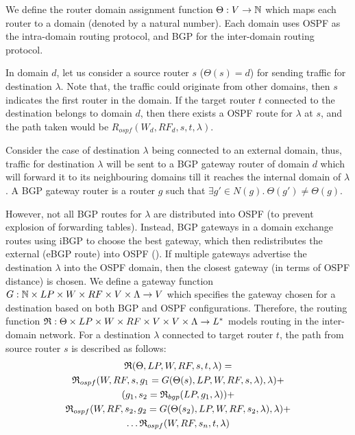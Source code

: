 We define the router domain assignment function
$\Theta: V \rightarrow \mathbb{N}$ which maps each router to a domain 
(denoted by a natural number). Each domain uses OSPF as the 
intra-domain routing protocol, and BGP for the inter-domain routing
protocol. 

In domain $d$, let us consider a source router $s$ ($\Theta(s) = d$) for 
sending traffic for destination $\lambda$. Note that, the traffic
could originate from other domains, then $s$ indicates the first
router in the domain. If the target router $t$ 
connected to the destination belongs to domain $d$, then there exists
a OSPF route for $\lambda$ at $s$, and the path taken would be 
$R_{ospf}(W_d, RF_d, s,t,\lambda)$.

Consider the case of destination $\lambda$ being connected 
to an external domain, thus, traffic for destination $\lambda$
will be sent to a BGP gateway router of domain $d$ which 
will forward it to its neighbouring domains till
it reaches the internal domain of $\lambda$. A BGP gateway
router is a router $g$ such that $\exists g' \in N(g). 
~\Theta(g') \not= \Theta(g)$. 

However, not all BGP routes for $\lambda$
are distributed 
into OSPF (to prevent explosion of forwarding tables). Instead,
BGP gateways in a domain exchange routes using iBGP to choose
the best gateway, which then redistributes the external
(eBGP route) into OSPF (). If multiple
gateways advertise the destination $\lambda$ into the OSPF 
domain, then the closest gateway (in terms of OSPF distance)
is chosen. We define a gateway function $G: \mathbb{N} \times LP \times
W \times RF \times V \times \Lambda \rightarrow V$ which specifies
the gateway chosen for a destination based on both BGP and OSPF
configurations. Therefore, the routing function 
$\mathfrak{R}:\Theta \times LP \times W \times RF \times V \times V \times \Lambda \rightarrow L^*$ models routing in the inter-domain network. 
For a destination $\lambda$ connected to target router $t$, the 
path from source router $s$ is described as follows:
\begin{multline}
	\mathfrak{R}(\Theta, LP, W, RF, s, t, \lambda) = \\
	\mathfrak{R}_{ospf}(W,RF,s,g_1=G(\Theta(s),LP,W,RF,s,\lambda), \lambda) + \\
	 (g_1, s_2=\mathfrak{R}_{bgp}(LP, g_1, \lambda))+ \\
	\mathfrak{R}_{ospf}(W,RF,s_2,g_2=G(\Theta(s_2),LP,W,RF,s_2,\lambda), \lambda) + \\
	\ldots \mathfrak{R}_{ospf}(W,RF,s_n,t,\lambda)
\end{multline}

